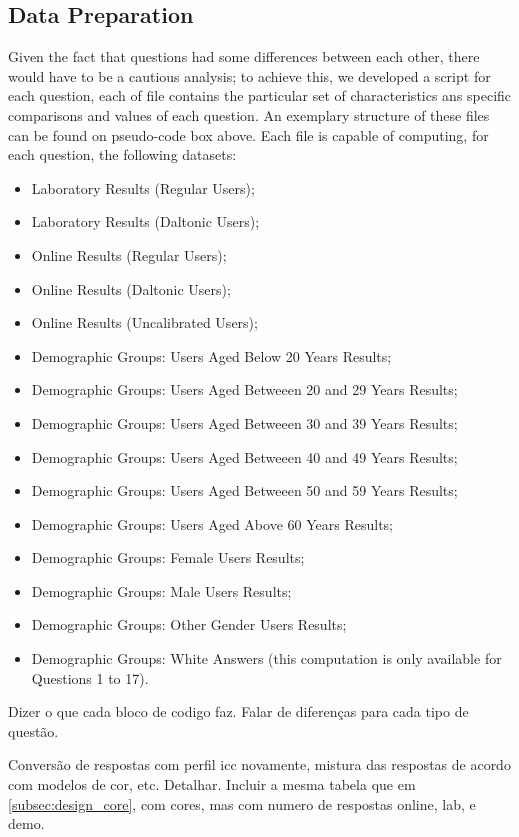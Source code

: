 \subsection{Data Preparation}
\label{subsec:results_preparation}
%
Given the fact that questions had some differences between each other, there would have to be a cautious analysis; to achieve this, we developed a script for each question, each of
file contains the particular set of characteristics ans specific comparisons and values of each question. An exemplary structure of these files can be found on pseudo-code box above.
Each file is capable of computing, for each question, the following datasets:
%
\begin{itemize}
  \item Laboratory Results (Regular Users);
  \item Laboratory Results (Daltonic Users);
  \item Online Results (Regular Users);
  \item Online Results (Daltonic Users);
  \item Online Results (Uncalibrated Users);
  \item Demographic Groups: Users Aged Below 20 Years Results;
  \item Demographic Groups: Users Aged Betweeen 20 and 29 Years Results;
  \item Demographic Groups: Users Aged Betweeen 30 and 39 Years Results;
  \item Demographic Groups: Users Aged Betweeen 40 and 49 Years Results;
  \item Demographic Groups: Users Aged Betweeen 50 and 59 Years Results;
  \item Demographic Groups: Users Aged Above 60 Years Results;
  \item Demographic Groups: Female Users Results;
  \item Demographic Groups: Male Users Results;
  \item Demographic Groups: Other Gender Users Results;
  \item Demographic Groups: White Answers (this computation is only available for Questions 1 to 17).
\end{itemize} \par
%
Dizer o que cada bloco de codigo faz. Falar de diferenças para cada tipo de questão. \par
%
Conversão de respostas com perfil icc novamente, mistura das respostas de acordo com modelos de cor, etc.
Detalhar.
Incluir a mesma tabela que em \ref{subsec:design_core}, com cores, mas com numero de respostas online, lab, e demo.
%
